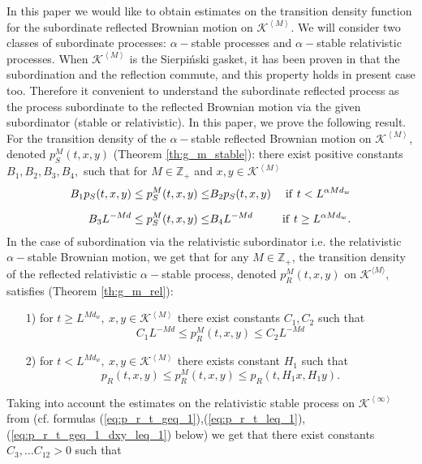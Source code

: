 \documentclass[11pt]{article}
\begin{document}
In this paper we would like to obtain estimates on the transition density function \linebreak for the subordinate reflected Brownian motion on $\mathcal{K}^{\left\langle M \right\rangle}.$ We will consider two classes of subordinate processes: $\alpha-$stable processes and  $\alpha-$stable relativistic processes. When $\mathcal{K}^{\left\langle M \right\rangle}$ is the Sierpi\'nski gasket, it has been proven in \cite{bib:KaPP2} that the subordination and the reflection commute, and this property holds in present case too. Therefore it convenient to understand the subordinate reflected process as the process subordinate to the reflected Brownian motion via the given subordinator (stable or relativistic). \linebreak In this paper, we prove the following result. For the transition density of the $\alpha-$stable reflected Brownian motion on $\mathcal{K}^{\left\langle M \right\rangle}$, denoted $p^M_S(t,x,y)$ (Theorem \ref{th:g_m_stable}): there exist  positive constants $B_1,B_2,B_3,B_4,$ such that for $M \in \mathbb{Z}_+$ and $x,y \in \mathcal{K}^{\left\langle M \right\rangle}$
\begin{eqnarray*}
B_1p_{S}(t,x,y)  \leq  p^M_S(t,x,y) \leq & B_2p_{S}(t,x,y) & \rm{ if } \textrm{ $t<L^{\alpha Md_{w}}$} \\[2mm]
B_3L^{-Md}  \leq  p^M_S(t,x,y)  \leq &  B_4L^{-Md} & \rm{ if } \textrm{ $t \geq L^{\alpha Md_{w}}.$} \\
\end{eqnarray*}
In the case of subordination via  the relativistic subordinator i.e. the relativistic $\alpha-$stable Brownian motion, we get that  for any $M \in \mathbb{Z}_+$, the transition density of the reflected relativistic $\alpha-$stable process, denoted $p_R^M(t,x,y)$ on $\mathcal K^{\langle M\rangle},$  satisfies (Theorem \ref{th:g_m_rel}):
\begin{enumerate}
\item[1)] for $ t \geq L^{Md_w},  \ x,y \in \mathcal{K}^{\left\langle M \right\rangle}$ there exist constants $C_1,C_2$ such that
\begin{equation}
C_1L^{-Md} \leq p^M_R(t,x,y) \leq C_2L^{-Md}
\end{equation}
\item[2)] for $t < L^{Md_w},   \ x,y \in \mathcal{K}^{\left\langle M \right\rangle}$ there exists constant $H_1$ such that
$$
p_R(t,x,y) \leq p_R^M(t,x,y) \leq p_R(t,H_1x,H_1y).
$$
\end{enumerate}
Taking into account the estimates on the relativistic stable process on $\mathcal{K}^{\left\langle \infty \right\rangle}$ from \cite{bib:Bal-Kpp} (cf. formulas (\ref{eq:p_r_t_geq_1}),(\ref{eq:p_r_t_leq_1}),(\ref{eq:p_r_t_geq_1_dxy_leq_1}) below)  we get that there exist constants $C_3,\ldots C_{12} > 0$ such that
\end{document}
